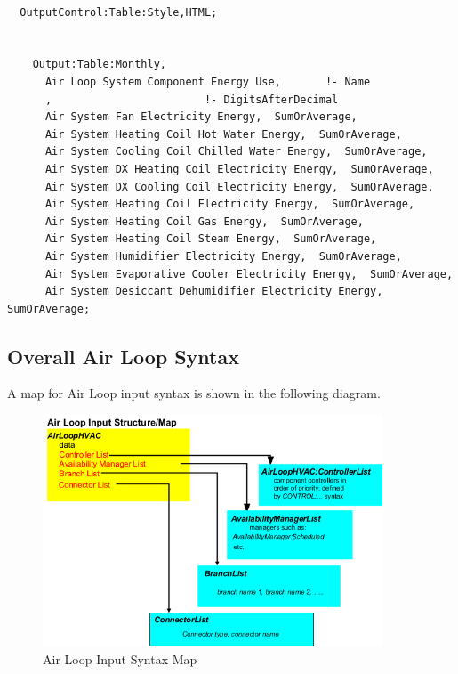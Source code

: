 \begin{lstlisting}

  OutputControl:Table:Style,HTML;


    Output:Table:Monthly,
      Air Loop System Component Energy Use,       !- Name
      ,                        !- DigitsAfterDecimal
      Air System Fan Electricity Energy,  SumOrAverage,
      Air System Heating Coil Hot Water Energy,  SumOrAverage,
      Air System Cooling Coil Chilled Water Energy,  SumOrAverage,
      Air System DX Heating Coil Electricity Energy,  SumOrAverage,
      Air System DX Cooling Coil Electricity Energy,  SumOrAverage,
      Air System Heating Coil Electricity Energy,  SumOrAverage,
      Air System Heating Coil Gas Energy,  SumOrAverage,
      Air System Heating Coil Steam Energy,  SumOrAverage,
      Air System Humidifier Electricity Energy,  SumOrAverage,
      Air System Evaporative Cooler Electricity Energy,  SumOrAverage,
      Air System Desiccant Dehumidifier Electricity Energy,  SumOrAverage;
\end{lstlisting}

\subsection{Overall Air Loop Syntax}\label{overall-air-loop-syntax}

A map for Air Loop input syntax is shown in the following diagram.

\begin{figure}[hbtp] %
\centering
\includegraphics[width=0.9\textwidth, height=0.9\textheight, keepaspectratio=true]{media/image214.png}
\caption{Air Loop Input Syntax Map \protect \label{fig:air-loop-input-syntax-map}}
\end{figure}

